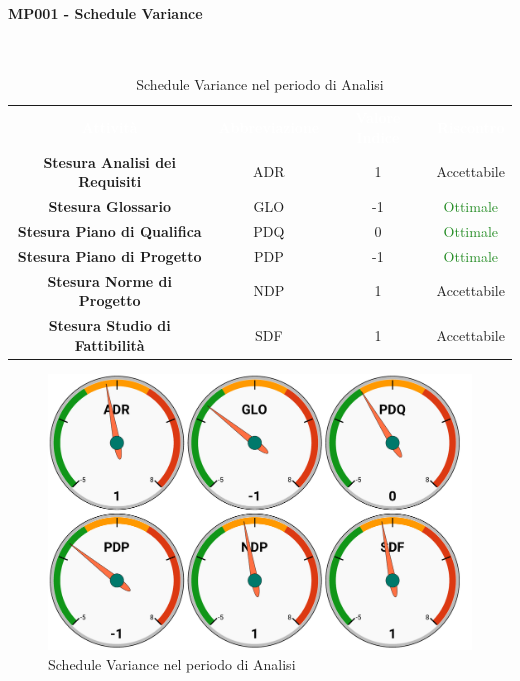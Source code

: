 \paragraph{MP001 - Schedule Variance}\mbox{}\\[0,3cm]
\begin{table}[H]
    \centering
    \begin{tabular}{cccc}
        \rowcolor{greySWEight}
        \textcolor{white}{\textbf{Attività}} & 
        \textcolor{white}{\textbf{Abbreviazione}} &
        \textcolor{white}{\textbf{Valore Indice}}&
        \textcolor{white}{\textbf{Riscontro}}\\
		\textbf{Stesura Analisi dei Requisiti} & ADR & 1 & \textcolor{YellowOrange}{Accettabile}\\
		\textbf{Stesura Glossario} & GLO & -1 & \textcolor{ForestGreen}{Ottimale} \\
		\textbf{Stesura Piano di Qualifica} & PDQ & 0 & \textcolor{ForestGreen}{Ottimale} \\
		\textbf{Stesura Piano di Progetto} & PDP & -1 & \textcolor{ForestGreen}{Ottimale} \\
		\textbf{Stesura Norme di Progetto} & NDP & 1 & \textcolor{YellowOrange}{Accettabile} \\
		\textbf{Stesura Studio di Fattibilità} & SDF & 1 & \textcolor{YellowOrange}{Accettabile} \\

    \end{tabular}
    \caption{Schedule Variance nel periodo di Analisi}
\end{table}
\begin{figure}[H]
    \centering
	\includegraphics[width=1\linewidth]{sez/App_Esito/Analisi/graph/AN_SV.pdf}
	\caption{Schedule Variance nel periodo di Analisi}
\end{figure}

